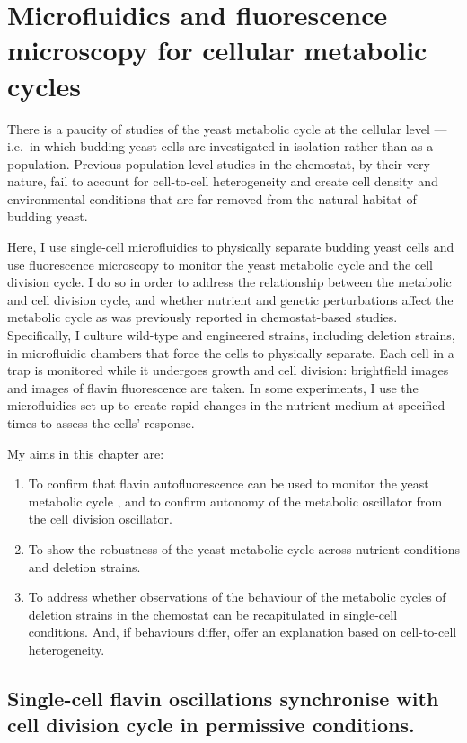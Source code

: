 \chapter{Microfluidics and fluorescence microscopy for cellular metabolic cycles}
\label{ch:biology}

There is a paucity of studies of the yeast metabolic cycle at the cellular level --- i.e.\ in which budding yeast cells are investigated in isolation rather than as a population.
Previous population-level studies in the chemostat, by their very nature, fail to account for cell-to-cell heterogeneity and create cell density and environmental conditions that are far removed from the natural habitat of budding yeast.

Here, I use single-cell microfluidics to physically separate budding yeast cells and use fluorescence microscopy to monitor the yeast metabolic cycle and the cell division cycle.
I do so in order to address the relationship between the metabolic and cell division cycle, and whether nutrient and genetic perturbations affect the metabolic cycle as was previously reported in chemostat-based studies.
Specifically, I culture wild-type and engineered strains, including deletion strains, in microfluidic chambers that force the cells to physically separate.
Each cell in a trap is monitored while it undergoes growth and cell division: brightfield images and images of flavin fluorescence are taken.
In some experiments, I use the microfluidics set-up to create rapid changes in the nutrient medium at specified times to assess the cells' response.

My aims in this chapter are:
\begin{enumerate}
  \item To confirm that flavin autofluorescence can be used to monitor the yeast metabolic cycle \parencite{baumgartnerFlavinbasedMetabolicCycles2018}, and to confirm autonomy of the metabolic oscillator from the cell division oscillator.
  \item To show the robustness of the yeast metabolic cycle across nutrient conditions and deletion strains.
  \item To address whether observations of the behaviour of the metabolic cycles of deletion strains in the chemostat can be recapitulated in single-cell conditions.
        And, if behaviours differ, offer an explanation based on cell-to-cell heterogeneity.
\end{enumerate}

\section[Permissive conditions]{Single-cell flavin oscillations synchronise with cell division cycle in permissive conditions.}
\label{sec:biology-sync}


